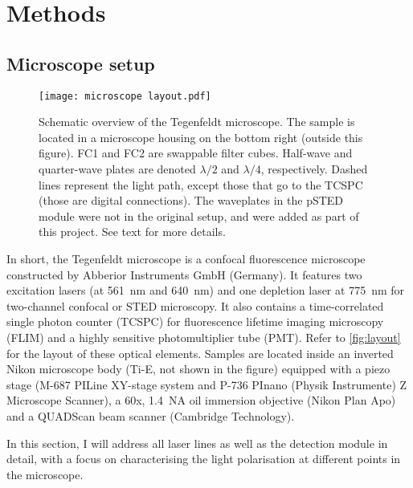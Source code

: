 \chapter{Methods}


\section{Microscope setup}

\begin{figure}[bh]
	\centering
	\texttt{[image: microscope layout.pdf]}
	\caption{
		Schematic overview of the Tegenfeldt microscope. The sample is located in a microscope housing on the bottom right (outside this figure). FC1 and FC2 are swappable filter cubes. Half-wave and quarter-wave plates are denoted $ \lambda/2 $ and $ \lambda/4 $, respectively. Dashed lines represent the light path, except those that go to the TCSPC (those are digital connections). The waveplates in the pSTED module were not in the original setup, and were added as part of this project. See text for more details.
	}
	\label{fig:layout}
\end{figure}

In short, the Tegenfeldt microscope is a confocal fluorescence microscope constructed by Abberior Instruments GmbH (Germany). It features two excitation lasers (at 561~nm and 640~nm) and one depletion laser at 775~nm for two-channel confocal or STED microscopy. It also contains a time-correlated single photon counter (TCSPC) for fluorescence lifetime imaging microscopy (FLIM) and a highly sensitive photomultiplier tube (PMT). Refer to \autoref{fig:layout} for the layout of these optical elements. Samples are located inside an inverted Nikon microscope body (Ti-E, not shown in the figure) equipped with a piezo stage (M-687 PILine XY-stage system and P-736 PInano (Physik Instrumente) Z Microscope Scanner), a 60x, 1.4~NA oil immersion objective (Nikon Plan Apo) and a QUADScan beam scanner (Cambridge Technology).

In this section, I will address all laser lines as well as the detection module in detail, with a focus on characterising the light polarisation at different points in the microscope.

